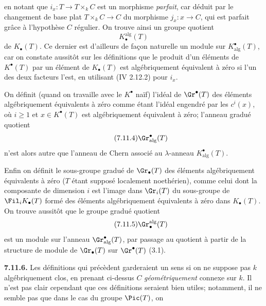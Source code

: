 
en notant que \(i_x:T\to T\times_k C\) est un morphisme \emph{parfait}, car déduit par le changement de base plat \(T\times_k C\to C\) du morphisme \(j_x:x\to C\), qui est parfait grâce à l'hypothèse \(C\) régulier. On trouve ainsi un groupe quotient
\begin{equation}\tag{7.11.3}
  K_\bullet^{\mathrm{alg}}(T)
\end{equation}
de \(K_\bullet(T)\). Ce dernier est d'ailleurs de façon naturelle un module sur \(K^\bullet_{\mathrm{alg}}(T)\), car on constate aussitôt sur les définitions que le produit d'un éléments de \(K^\bullet(T)\) par un élément de \(K_\bullet(T)\) est algébriquement équivalent à zéro si l'un des deux facteurs l'est, en utilisant (IV 2.12.2) pour \(i_x\).

On définit (quand on travaille avec le \(K^\bullet\) naïf) l'idéal de \(\Gr^\bullet(T)\) des éléments algébriquement équivalents à zéro comme étant l'idéal engendré par les \(c^i(x)\), où \(i\geq1\) et \(x\in K^\bullet(T)\) est algébriquement équivalent à zéro; l'anneau gradué quotient
\begin{equation}\tag{7.11.4}
  \Gr^\bullet_{\mathrm{alg}}(T)
\end{equation}
n'est alors autre que l'anneau de Chern associé au \(\lambda\)-anneau \(K^\bullet_{\mathrm{alg}}(T)\).

Enfin on définit le sous-groupe gradué de \(\Gr_\bullet(T)\) des éléments algébriquement équivalents à zéro (\(T\) étant supposé localement noethérien), comme celui dont la composante de dimension \(i\) est l'image dans \(\Gr_i(T)\) du sous-groupe de \(\Fil_iK_\bullet(T)\) formé des éléments algébriquement équivalents à zéro dans \(K_\bullet(T)\). On trouve aussitôt que le groupe gradué quotient
\begin{equation}\tag{7.11.5}
  \Gr_\bullet^{\mathrm{alg}}(T)
\end{equation}
est un module sur l'anneau \(\Gr^\bullet_{\mathrm{alg}}(T)\), par passage au quotient à partir de la structure de module de \(\Gr_\bullet(T)\) sur \(\Gr^\bullet(T)\) (3.1).

\textbf{7.11.6.} Les définitions qui précèdent garderaient un sens si on ne suppose pas \(k\) algébriquement clos, en prenant ci-dessus \(C\) \emph{géométriquement} connexe sur \(k\). Il n'est pas clair cependant que ces définitions seraient bien utiles; notamment, il ne semble pas que dans le cas du groupe \(\Pic(T)\), on

